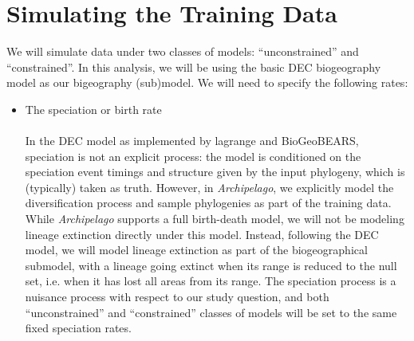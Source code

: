 \documentclass[11pt,openany]{memoir} %
\newcommand{\archipelagoModel}{\textit{Archipelago}\xspace}
\begin{document}
\section{Simulating the Training Data}

We will simulate data under two classes of models: ``unconstrained'' and ``constrained''.
In this analysis, we will be using the basic DEC biogeography model as our bigeography (sub)model.
We will need to specify the following rates:

\begin{itemize}
    \item The speciation or birth rate \hfill \\
        \\
        In the DEC model as implemented by lagrange and BioGeoBEARS, speciation is not an explicit process: the model is conditioned on the speciation event timings and structure given by the input phylogeny, which is (typically) taken as truth.
        However, in \archipelagoModel, we explicitly model the diversification process and sample phylogenies as part of the training data.
        While \archipelagoModel supports a full birth-death model, we will not be modeling lineage extinction directly under this model.
        Instead, following the DEC model, we will model lineage extinction as part of the biogeographical submodel, with a lineage going extinct when its range is reduced to the null set, i.e. when it has lost all areas from its range.
        The speciation process is a nuisance process with respect to our study question, and both ``unconstrained'' and ``constrained'' classes of models will be set to the same fixed speciation rates.

\end{itemize}
\end{document}
